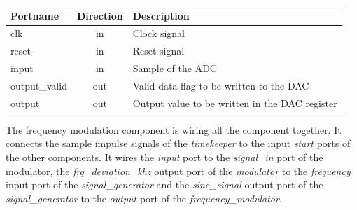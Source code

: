 \begin{center}
	\begin{tabular}{ | l | c | l | }
		\hline
		\textbf{Portname} & \textbf{Direction} & \textbf{Description} \\
		\hline
		clk & in & Clock signal \\
		reset & in  & Reset signal \\
		input & in  & Sample of the ADC \\
		output\_valid & out  & Valid data flag to be written to the DAC \\
		output & out  & Output value to be written in the DAC register \\
		\hline
	\end{tabular} 
\end{center}

The frequency modulation component is wiring all the component together. It connects the sample impulse signals of the \textit{timekeeper} to the input \textit{start} ports of the other components. It wires the \textit{input} port to the \textit{signal\_in} port of the modulator, the \textit{frq\_deviation\_khz} output port of the \textit{modulator} to the \textit{frequency} input port of the \textit{signal\_generator} and the \textit{sine\_signal} output port of the \textit{signal\_generator} to the \textit{output} port of the \textit{frequency\_modulator}.




